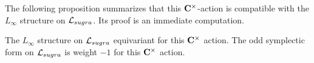 The following proposition summarizes that this $\mathbf{C}^\times$-action is compatible with the $L_\infty$ structure on $\mathcal L_{sugra}$.
Its proof is an immediate computation. 

\begin{prop}
The $L_\infty$ structure on $\mathcal L_{sugra}$ equivariant for this $\mathbf{C}^\times$ action. 
The odd symplectic form on $\mathcal L_{sugra}$ is weight $-1$ for this $\mathbf{C}^\times$ action. 
\end{prop}

%
